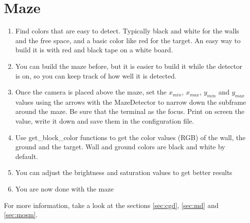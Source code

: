 \section{Maze}
\label{sec:howto:maze}

    \begin{enumerate}
        \item Find colors that are easy to detect. Typically black and 
            white for the walls and the free space, and a basic color 
            like red for the target. An easy way to build it is with red 
            and black tape on a white board.
        \item You can build the maze before, but it is easier to build 
            it while the detector is on, so you can keep track of how 
            well it is detected.
        \item Once the camera is placed above the maze, set the 
            $x_{min}$, $x_{max}$, $y_{min}$ and $y_{max}$
            values using the arrows with the 
            MazeDetector to narrow down the subframe around the maze. 
            Be sure that the terminal as the focus. Print on screen the 
            value, write it down and save them in the configuration file.
        \item Use get\_block\_color functions to get the color values 
            (RGB) of the wall, the ground and the target. Wall and ground 
            colors are black and white by default.
        \item You can adjust the brightness and saturation values to get 
            better results
        \item You are now done with the maze
    \end{enumerate}

For more information, take a look at the sections \ref{sec:cgd},  
\ref{sec:md} and \ref{sec:mosm}.
